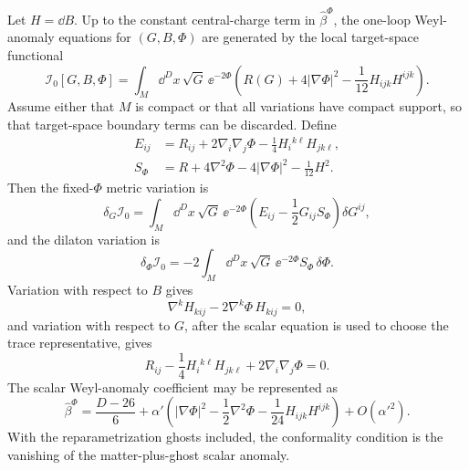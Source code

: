 \begin{lemma}
\label{lem:nlsm-one-loop-string-frame-functional}
Let \(H=\dd B\).  Up to the constant central-charge term in
\(\widehat\beta^\Phi\), the one-loop Weyl-anomaly equations for
\((G,B,\Phi)\) are generated by the local target-space functional
\begin{equation}
  \mathcal I_0[G,B,\Phi]
  =
  \int_M
  \dd^D x\,\sqrt G\,\ee^{-2\Phi}
  \left(
    R(G)+4|\nabla\Phi|^2-\frac1{12}H_{ijk}H^{ijk}
  \right).
  \label{eq:nlsm-string-frame-functional-one-loop}
\end{equation}
Assume either that \(M\) is compact or that all variations have compact
support, so that target-space boundary terms can be discarded.  Define
\begin{align}
  E_{ij}
  &=
  R_{ij}+2\nabla_i\nabla_j\Phi
  -\frac14H_i{}^{k\ell}H_{jk\ell},
  \label{eq:nlsm-string-frame-metric-e-tensor}\\
  S_\Phi
  &=
  R+4\nabla^2\Phi-4|\nabla\Phi|^2-\frac1{12}H^2 .
  \label{eq:nlsm-string-frame-scalar-e-tensor}
\end{align}
Then the fixed-\(\Phi\) metric variation is
\begin{equation}
  \delta_G\mathcal I_0
  =
  \int_M\dd^D x\,\sqrt G\,\ee^{-2\Phi}
  \left(E_{ij}-\frac12G_{ij}S_\Phi\right)\delta G^{ij},
  \label{eq:nlsm-string-frame-full-metric-variation}
\end{equation}
and the dilaton variation is
\begin{equation}
  \delta_\Phi\mathcal I_0
  =
  -2\int_M\dd^D x\,\sqrt G\,\ee^{-2\Phi}S_\Phi\,\delta\Phi .
  \label{eq:nlsm-string-frame-dilaton-variation}
\end{equation}
Variation with respect to \(B\) gives
\begin{equation}
  \nabla^kH_{kij}-2\nabla^k\Phi\,H_{kij}=0,
  \label{eq:nlsm-b-field-eom-one-loop}
\end{equation}
and variation with respect to \(G\), after the scalar equation is used to
choose the trace representative, gives
\begin{equation}
  R_{ij}-\frac14H_i{}^{k\ell}H_{jk\ell}
  +2\nabla_i\nabla_j\Phi=0.
  \label{eq:nlsm-metric-eom-one-loop}
\end{equation}
The scalar Weyl-anomaly coefficient may be represented as
\begin{equation}
  \widehat\beta^\Phi
  =
  \frac{D-26}{6}
  +
  \alpha'
  \left(
    |\nabla\Phi|^2
    -\frac12\nabla^2\Phi
    -\frac1{24}H_{ijk}H^{ijk}
  \right)
  +O(\alpha'^2).
  \label{eq:nlsm-dilaton-weyl-anomaly-one-loop}
\end{equation}
With the reparametrization ghosts included, the conformality condition is
the vanishing of the matter-plus-ghost scalar anomaly.
\end{lemma}

